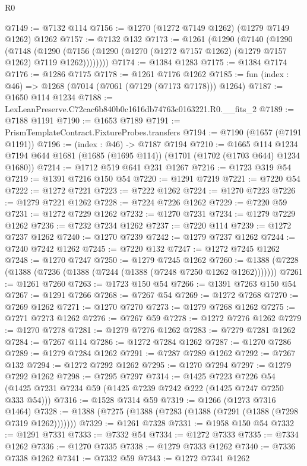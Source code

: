 \begin{lexlean}{R0}
\begin{coremodule}
@7149 := @7132 @114
@7156 := @1270 (@1272 @7149 @1262) (@1279 @7149 @1262) @1262
@7157 := @7132 @132
@7173 := @1261
    (@1290
      (@7140
        (@1290
          (@7148
            (@1290 (@7156 (@1290 (@1270 (@1272 @7157 @1262) (@1279 @7157 @1262) @7119 @1262))))))))
@7174 := @1384 @1283
@7175 := @1384 @7174
@7176 := @1286 @7175
@7178 := @1261 @7176 @1262
@7185 := fun (index : @46) => @1268 (@7014 (@7061 (@7129 (@7173 @7178))) @1264)
@7187 := @1650 @114 @1234
@7188 := LexLeanPreserve.C72cac6b840b0c1616db74763c0163221.R0.__fits_2
@7189 := @7188 @1191
@7190 := @1653 @7189
@7191 := PrismTemplateContract.FixtureProbes.transfers
@7194 := @7190 (@1657 (@7191 @1191))
@7196 := (index : @46) -> @7187 @7194
@7210 := @1665
    @114
    @1234
    @7194
    @644
    @1681
    (@1685 (@1695 @114))
    (@1701 (@1702 (@1703 @644) @1234 @1680))
@7214 := @1712 @519 @641 @231 @1267
@7216 := @1723 @319 @54
@7219 := @1391 @7216 @150 @54
@7220 := @1291 @7219
@7221 := @7220 @54
@7222 := @1272 @7221
@7223 := @7222 @1262
@7224 := @1270 @7223
@7226 := @1279 @7221 @1262
@7228 := @7224 @7226 @1262
@7229 := @7220 @59
@7231 := @1272 @7229 @1262
@7232 := @1270 @7231
@7234 := @1279 @7229 @1262
@7236 := @7232 @7234 @1262
@7237 := @7220 @114
@7239 := @1272 @7237 @1262
@7240 := @1270 @7239
@7242 := @1279 @7237 @1262
@7244 := @7240 @7242 @1262
@7245 := @7220 @132
@7247 := @1272 @7245 @1262
@7248 := @1270 @7247
@7250 := @1279 @7245 @1262
@7260 := @1388 (@7228 (@1388 (@7236 (@1388 (@7244 (@1388 (@7248 @7250 @1262 @1262)))))))
@7261 := @1261 @7260
@7263 := @1723 @150 @54
@7266 := @1391 @7263 @150 @54
@7267 := @1291 @7266
@7268 := @7267 @54
@7269 := @1272 @7268
@7270 := @7269 @1262
@7271 := @1270 @7270
@7273 := @1279 @7268 @1262
@7275 := @7271 @7273 @1262
@7276 := @7267 @59
@7278 := @1272 @7276 @1262
@7279 := @1270 @7278
@7281 := @1279 @7276 @1262
@7283 := @7279 @7281 @1262
@7284 := @7267 @114
@7286 := @1272 @7284 @1262
@7287 := @1270 @7286
@7289 := @1279 @7284 @1262
@7291 := @7287 @7289 @1262
@7292 := @7267 @132
@7294 := @1272 @7292 @1262
@7295 := @1270 @7294
@7297 := @1279 @7292 @1262
@7298 := @7295 @7297
@7314 := @1425
    @7223
    @7226
    @54
    (@1425 @7231 @7234 @59 (@1425 @7239 @7242 @222 (@1425 @7247 @7250 @333 @54)))
@7316 := @1528 @7314 @59
@7319 := @1266 (@1273 @7316 @1464)
@7328 := @1388 (@7275 (@1388 (@7283 (@1388 (@7291 (@1388 (@7298 @7319 @1262)))))))
@7329 := @1261 @7328
@7331 := @1958 @150 @54
@7332 := @1291 @7331
@7333 := @7332 @54
@7334 := @1272 @7333
@7335 := @7334 @1262
@7336 := @1270 @7335
@7338 := @1279 @7333 @1262
@7340 := @7336 @7338 @1262
@7341 := @7332 @59
@7343 := @1272 @7341 @1262

\end{coremodule}
\end{lexlean}
